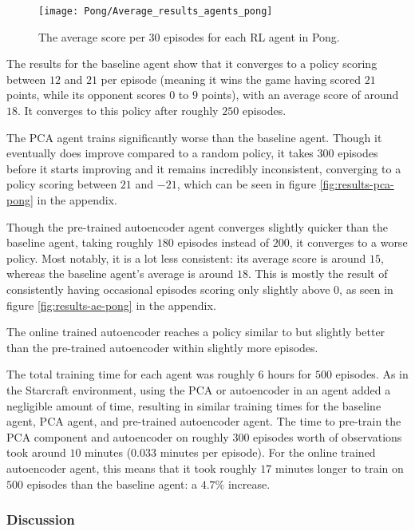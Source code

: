 \begin{figure}[h!]
	\centering
	\texttt{[image: Pong/Average\_results\_agents\_pong]}	
	\caption{The average score per 30 episodes for each RL agent in Pong.}
	\label{fig:results-pong-average}
\end{figure}

The results for the baseline agent show that it converges to a policy scoring between $12$ and $21$ per episode (meaning it wins the game having scored $21$ points, while its opponent scores $0$ to $9$ points), with an average score of around $18$. It converges to this policy after roughly $250$ episodes.

The PCA agent trains significantly worse than the baseline agent. Though it eventually does improve compared to a random policy, it takes $300$ episodes before it starts improving and it remains incredibly inconsistent, converging to a policy scoring between $21$ and $-21$, which can be seen in figure \ref{fig:results-pca-pong} in the appendix. %

Though the pre-trained autoencoder agent converges slightly quicker than the baseline agent, taking roughly $180$ episodes instead of $200$, it converges to a worse policy. Most notably, it is a lot less consistent: its average score is around $15$, whereas the baseline agent's average is around $18$. This is mostly the result of consistently having occasional episodes scoring only slightly above $0$, as seen in figure \ref{fig:results-ae-pong} in the appendix.

The online trained autoencoder reaches a policy similar to but slightly better than the pre-trained autoencoder within slightly more episodes.

The total training time for each agent was roughly 6 hours for $500$ episodes. As in the Starcraft environment, using the PCA or autoencoder in an agent added a negligible amount of time, resulting in similar training times for the baseline agent, PCA agent, and pre-trained autoencoder agent. The time to pre-train the PCA component and autoencoder on roughly $300$ episodes worth of observations took around $10$ minutes ($0.033$ minutes per episode). For the online trained autoencoder agent, this means that it took roughly $17$ minutes longer to train on $500$ episodes than the baseline agent: a $4.7\%$ increase.

\clearpage
\subsubsection{Discussion}\label{research-discussion-pong}
